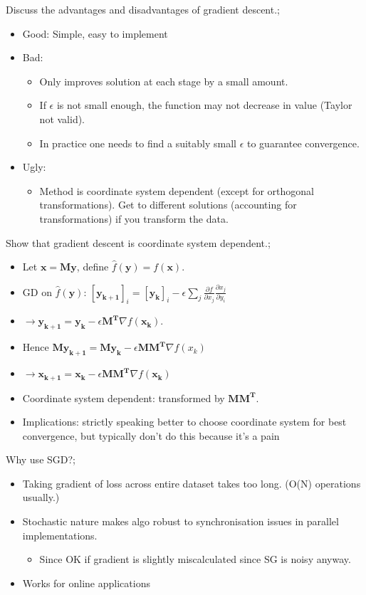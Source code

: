 \documentclass{article}
\begin{document}
Discuss the advantages and disadvantages of gradient descent.; \begin{itemize}
	\item Good: Simple, easy to implement
	\item Bad: 
	\begin{itemize}
		\item Only improves solution at each stage by a small amount.
		\item If $\epsilon$ is not small enough, the function may not decrease in value (Taylor not valid). \item In practice one needs to find a suitably small $\epsilon$ to guarantee convergence.
	\end{itemize}
\item Ugly: \begin{itemize}
	\item Method is coordinate system dependent (except for orthogonal transformations). Get to different solutions (accounting for transformations) if you transform the data.
\end{itemize}

\end{itemize}
Show that gradient descent is coordinate system dependent.; \begin{itemize}
	\item Let $\mathbf{x=My}$, define $\hat{f}(\mathbf{y})=f(\mathbf{x})$.
	\item GD on $\hat{f}(\mathbf{y})$: $[\mathbf{y_{k+1}}]_i = [\mathbf{y_k}]_i - \epsilon \sum_j \frac{\partial f}{\partial x_j}\frac{\partial x_j}{\partial y_i}$ \item $\rightarrow \mathbf{y_{k+1}} = \mathbf{y_k} - \epsilon \mathbf{M^T}\nabla f(\mathbf{x_k})$.
	\item Hence $\mathbf{My_{k+1}=My_k}-\epsilon \mathbf{MM^T}\nabla f(x_k)$ \item $\rightarrow \mathbf{x_{k+1}}=\mathbf{x_k}-\epsilon\mathbf{MM^T}\nabla f(\mathbf{x_k})$
	\item Coordinate system dependent: transformed by $\mathbf{MM^T}$.
	\item Implications: strictly speaking better to choose coordinate system for best convergence, but typically don't do this because it's a pain
\end{itemize}

Why use SGD?; \begin{itemize}
	\item Taking gradient of loss across entire dataset takes too long. (O(N) operations usually.)
	\item Stochastic nature makes algo robust to synchronisation issues in parallel implementations. \begin{itemize}
		\item Since OK if gradient is slightly miscalculated since SG is noisy anyway.
	\end{itemize}
\item Works for online applications
\end{itemize}
\end{document}
